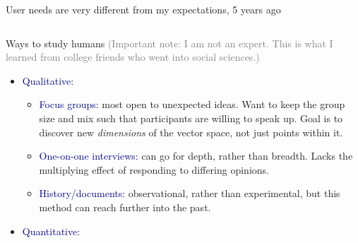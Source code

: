 \documentclass[aspectratio=169]{beamer}
\begin{document}
\begin{frame}{User needs are very different from my expectations, 5 years ago}
\vspace{0.25 cm}
\begin{columns}
\end{columns}

\vspace{0.1 cm}
\end{frame}

\begin{frame}{Ways to study humans}
\vspace{0.1 cm}
\textcolor{gray}{\scriptsize (Important note: I am not an expert. This is what I learned from college friends who went into social sciences.)}

\large
\vspace{0.1 cm}
\begin{itemize}\setlength{\itemsep}{0.25 cm}
\item \textcolor{darkblue}{Qualitative:}

\vspace{0.05 cm}
\begin{itemize}\large\setlength{\itemsep}{0.15 cm}
\item \textcolor{darkblue}{Focus groups:} \normalsize most open to unexpected ideas. Want to keep the group size and mix such that participants are willing to speak up. Goal is to discover new {\it dimensions} of the vector space, not just points within it. \large

\item \textcolor{darkblue}{One-on-one interviews:} \normalsize can go for depth, rather than breadth. Lacks the multiplying effect of responding to differing opinions. \large

\item \textcolor{darkblue}{History/documents:} \normalsize observational, rather than experimental, but this method can reach further into the past. \large
\end{itemize}

\item \textcolor{darkblue}{Quantitative:}


\end{itemize}
\end{frame}
\end{document}
